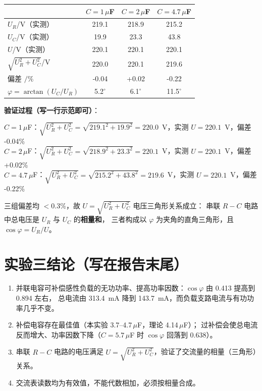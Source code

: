 \documentclass[UTF8,a4paper,10.5pt]{ctexart}
\newcommand{\key}[1]{\textbf{\color{acc}#1}}
\newcommand{\ok}[1]{\textcolor{okc}{#1}}
\begin{document}
\begin{center}
\small\setlength{\tabcolsep}{8pt}
\begin{tabular}{@{}lccc@{}}
\toprule
 & $C=1\,\mu$F & $C=2\,\mu$F & $C=4.7\,\mu$F\\
\midrule
$U_R$/V（实测） & 219.1 & 218.9 & 215.2\\
$U_C$/V（实测） & 19.9 & 23.3 & 43.8\\
$U$/V（实测） & 220.1 & 220.1 & 220.1\\
$\sqrt{U_R^2+U_C^2}$/V & 220.0 & 220.1 & 219.6\\
偏差 $/\%$ & -0.04 & +0.02 & -0.22\\
$\varphi=\arctan(U_C/U_R)$ & 5.2$^\circ$ & 6.1$^\circ$ & 11.5$^\circ$\\
\bottomrule
\end{tabular}
\end{center}

\noindent\textbf{验证过程（写一行示范即可）}：
\par\noindent
\quad $C=1\,\mu$F：$\sqrt{U_R^2+U_C^2}=\sqrt{219.1^2+19.9^2}=220.0$~V，实测 $U=220.1$~V，偏差 -0.04\%\\
\quad $C=2\,\mu$F：$\sqrt{U_R^2+U_C^2}=\sqrt{218.9^2+23.3^2}=220.1$~V，实测 $U=220.1$~V，偏差 +0.02\%\\
\quad $C=4.7\,\mu$F：$\sqrt{U_R^2+U_C^2}=\sqrt{215.2^2+43.8^2}=219.6$~V，实测 $U=220.1$~V，偏差 -0.22\%\\
\par\noindent
三组偏差均 $<0.3\%$，故 $U=\sqrt{U_R^2+U_C^2}$ \ok{电压三角形关系成立}：
串联 $R-C$ 电路中总电压是 $U_R$ 与 $U_C$ 的\key{相量和}，
三者构成以 $\varphi$ 为夹角的直角三角形，且 $\cos\varphi=U_R/U$。

\section{实验三结论（写在报告末尾）}
\begin{enumerate}
  \item 并联电容可补偿感性负载的无功功率、提高功率因数：$\cos\varphi$ 由 0.413 提高到 0.894 左右，
        总电流由 313.4~mA 降到 143.7~mA，而负载支路电流与有功功率几乎不变。
  \item 补偿电容存在最佳值（本实验 3.7--4.7\,$\mu$F，理论 4.14\,$\mu$F）；
        过补偿会使总电流反而增大、功率因数下降（$C=5.7\,\mu$F 时 $\cos\varphi$ 回落到 0.638）。
  \item 串联 $R-C$ 电路的电压满足 $U=\sqrt{U_R^2+U_C^2}$，验证了交流量的相量（三角形）关系。
  \item 交流表读数均为有效值，不能代数相加，必须按相量合成。
\end{enumerate}
\end{document}
